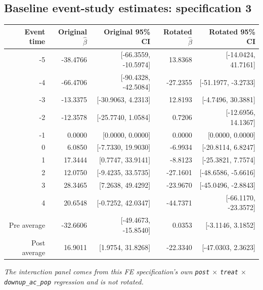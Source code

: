 \documentclass[10pt]{article}
\begin{document}
\subsection*{Baseline event-study estimates: specification 3}
\begin{center}
\scriptsize
\begin{tabular}{r rr rr}
\toprule
Event time & Original $\hat\beta$ & Original 95\% CI & Rotated $\hat\beta$ & Rotated 95\% CI \\
\midrule
-5 & -38.4766 & [-66.3559, -10.5974] & 13.8368 & [-14.0424, 41.7161] \\
-4 & -66.4706 & [-90.4328, -42.5084] & -27.2355 & [-51.1977, -3.2733] \\
-3 & -13.3375 & [-30.9063, 4.2313] & 12.8193 & [-4.7496, 30.3881] \\
-2 & -12.3578 & [-25.7740, 1.0584] & 0.7206 & [-12.6956, 14.1367] \\
-1 & 0.0000 & [0.0000, 0.0000] & 0.0000 & [0.0000, 0.0000] \\
0 & 6.0850 & [-7.7330, 19.9030] & -6.9934 & [-20.8114, 6.8247] \\
1 & 17.3444 & [0.7747, 33.9141] & -8.8123 & [-25.3821, 7.7574] \\
2 & 12.0750 & [-9.4235, 33.5735] & -27.1601 & [-48.6586, -5.6616] \\
3 & 28.3465 & [7.2638, 49.4292] & -23.9670 & [-45.0496, -2.8843] \\
4 & 20.6548 & [-0.7252, 42.0347] & -44.7371 & [-66.1170, -23.3572] \\
\midrule
Pre average & -32.6606 & [-49.4673, -15.8540] & 0.0353 & [-3.1146, 3.1852] \\
Post average & 16.9011 & [1.9754, 31.8268] & -22.3340 & [-47.0303, 2.3623] \\
\bottomrule
\end{tabular}
\end{center}
\medskip
\textit{The interaction panel comes from this FE specification's own \texttt{post} $\times$ \texttt{treat} $\times$ \texttt{downup\_ac\_pop} regression and is not rotated.}
\clearpage
\end{document}
